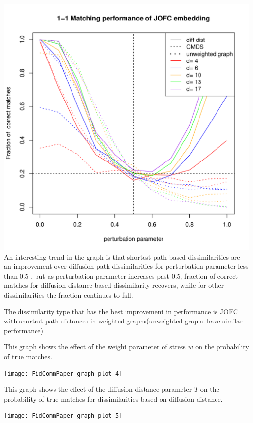 \documentclass[11pt]{article} %
\begin{document}
\includegraphics{graphs/FidCommPapergraph-plot-3}An interesting trend in the graph is that shortest-path based dissimilarities are an improvement over diffusion-path dissimilarities for perturbation parameter less than 0.5 , but as perturbation parameter increases past 0.5, fraction of correct matches for diffusion distance based dissimilarity recovers, while for other dissimilarities the fraction continues to fall. 

The dissimilarity type that has the best improvement in performance is JOFC with shortest path distances in weighted graphs(unweighted graphs have similar performance)



This graph shows the effect of the weight parameter of stress $w$ on the probability of true matches.

\texttt{[image: FidCommPaper-graph-plot-4]}


This graph shows the effect of the diffusion distance parameter $T$ on the probability of true matches for dissimilarities based on diffusion distance.


\texttt{[image: FidCommPaper-graph-plot-5]}
\end{document}
